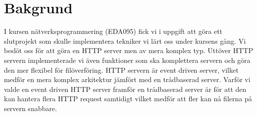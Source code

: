 \section{Bakgrund}
I kursen nätverksprogrammering (EDA095) fick vi i uppgift att göra ett slutprojekt som skulle implementera tekniker vi lärt oss under kursens gång. Vi beslöt oss för att göra en HTTP server men av mera komplex typ. Uttöver HTTP servern implementerade vi även funktioner som ska komplettera servern och göra den mer flexibel för filöverföring. 
HTTP servern är event driven server, vilket medför en mera komplex arkitektur jämfört med en trådbaserad server. 
Varför vi valde en event driven HTTP server framför en trådbaserad server är för att den kan hantera flera HTTP request samtidigt vilket medför att fler kan nå filerna på servern snabbare. 
